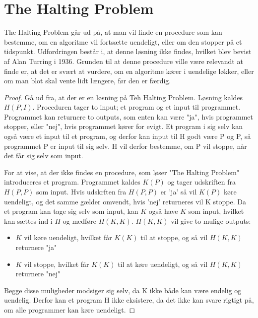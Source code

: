 \section{The Halting Problem}
The Halting Problem går ud på, at man vil finde en procedure som kan bestemme, om en algoritme vil fortsætte uendeligt, eller om den stopper på et tidspunkt. 
Udfordringen består i, at denne løsning ikke findes, hvilket blev bevist af Alan Turring i 1936.
Grunden til at denne procedure ville være relevandt at finde er, at det er svært at vurdere, om en algoritme kører i uendelige løkker, eller om man blot skal vente lidt længere, før den er færdig.

\begin{proof}
Gå ud fra, at der er en løsning på Teh Halting Problem. Løsning kaldes $H(P, I)$. Proceduren tager to input; et program og et input til programmet. Programmet kan returnere to outputs, som enten kan være "ja", hvis programmet stopper, eller "nej", hvis programmet kører for evigt. 
Et program i sig selv kan også være et input til et program, og derfor kan input til H godt være P og P, så programmet P er input til sig selv.
H vil derfor bestemme, om P vil stoppe, når det får sig selv som input.

For at vise, at der ikke findes en procedure, som løser "The Halting Problem" introduceres et program. 
Programmet kaldes $K(P)$ og tager udskriften fra $H(P,P)$ som input.
Hvis udskrften fra $H(P,P)$ er 'ja' så vil $K(P)$ køre uendeligt, og det samme gælder omvendt, hvis 'nej' returneres vil K stoppe.  
Da et program kan tage sig selv som input, kan $K$ også have $K$ som input, hvilket kan sættes ind i $H$ og  medføre $H(K,K)$. 
$H(K, K)$ vil give to mulige outputs:
\begin{itemize}
	\item $K$ vil køre uendeligt, hvilket får $K(K)$ til at stoppe, og så vil $H(K,K)$ returnere "ja"
	\item  $K$ vil stoppe, hvilket får $K(K)$ til at køre uendeligt, og så vil $H(K,K)$ returnere "nej"
\end{itemize}
Begge disse muligheder modsiger sig selv, da K ikke både kan være endelig og uendelig. Derfor kan et program H ikke eksistere, da det ikke kan svare rigtigt på, om alle programmer kan køre uendeligt. 

\end{proof}
